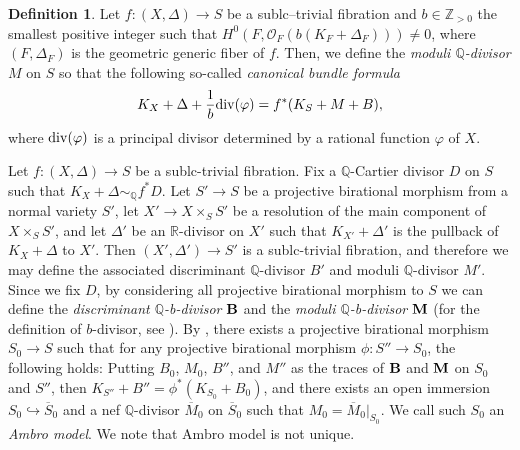 \documentclass[12pt,twoside]{amsart}
\theoremstyle{definition}
\newtheorem{defn}[thm]{Definition}
\begin{document}
\begin{defn}
Let $f\colon (X,\Delta)\to S$ be a sublc--trivial fibration and $b\in\mathbb{Z}_{>0}$ the smallest positive integer such that $H^0(F,\mathcal{O}_F(b(K_F+\Delta_F)))\ne0$, where $(F,\Delta_F)$ is the geometric generic fiber of $f$.
Then, we define the {\em moduli $\mathbb{Q}$-divisor} $M$ on $S$ so that the following so-called {\em canonical bundle formula}
\[
K_X+\Delta+\frac{1}{b}{\rm div}(\varphi)=f^*(K_S+M+B),
\]
 where ${\rm div}(\varphi)$ is a principal divisor determined by a rational function $\varphi$ of $X$.
 
Let $f\colon (X,\Delta)\to S$ be a sublc-trivial fibration. 
Fix a $\mathbb{Q}$-Cartier divisor $D$ on $S$ such that $K_{X}+\Delta \sim_{\mathbb{Q}}f^{*}D$.  
Let $S' \to S$ be a projective birational morphism from a normal variety $S'$, let $X' \to X\times_{S}S'$ be a resolution of the main component of $X \times_{S}S'$, and let $\Delta'$ be an $\mathbb{R}$-divisor on $X'$ such that $K_{X'}+\Delta'$ is the pullback of $K_{X}+\Delta$ to $X'$. 
Then $(X',\Delta') \to S'$ is a sublc-trivial fibration, and therefore we may define the associated discriminant $\mathbb{Q}$-divisor $B'$ and moduli $\mathbb{Q}$-divisor $M'$. 
Since we fix $D$, by considering all projective birational morphism to $S$ we can define the {\em discriminant $\mathbb{Q}$-b-divisor} $\boldsymbol{\rm B}$ and the {\em moduli $\mathbb{Q}$-b-divisor} $\boldsymbol{\rm M}$ (for the definition of $b$-divisor, see \cite{A}). 
By \cite[Theorem 1.2]{fujino-slc-trivial}, there exists a projective birational morphism $S_{0} \to S$ such that for any projective birational morphism $\phi \colon S'' \to S_{0}$, the following holds: Putting $B_{0}$, $M_{0}$, $B''$, and $M''$ as the traces of $\boldsymbol{\rm B}$ and $\boldsymbol{\rm M}$ on $S_{0}$ and $S''$, then $K_{S''}+B''=\phi^{*}(K_{S_{0}}+B_{0})$, and there exists an open immersion $S_{0} \hookrightarrow \overline{S}_{0}$ and a nef $\mathbb{Q}$-divisor $\overline{M}_{0}$ on $\overline{S}_{0}$ such that $M_{0}=\overline{M}_{0}|_{S_{0}}$. 
We call such $S_{0}$ an {\em Ambro model}. 
We note that Ambro model is not unique. 
\end{defn}
\end{document}

